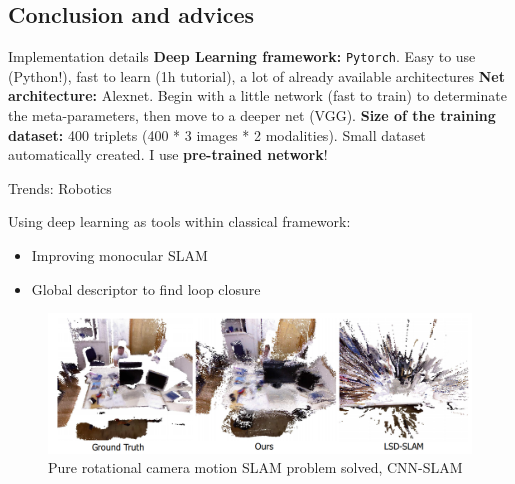 \subsection{Conclusion and advices}

\label{sec:results}

\begin{frame}{Implementation details}
	\vfill	
	\textbf{Deep Learning framework:} \texttt{Pytorch}. Easy to use (Python!), fast to learn (1h tutorial), a lot of already available architectures
	\vfill
	\textbf{Net architecture:} Alexnet. Begin with a little network (fast to train) to determinate the meta-parameters, then move to a deeper net (VGG).
	\vfill
	\textbf{Size of the training dataset:} 400 triplets (400 * 3 images * 2 modalities). Small dataset automatically created. I use \textbf{pre-trained network}!
	\vfill
\end{frame}

\begin{frame}{Trends: Robotics}

	Using deep learning as tools within classical framework:
	\begin{itemize}
		\item Improving monocular SLAM
		\item Global descriptor to find loop closure
	\end{itemize}
	\begin{figure}
		\includegraphics[width=0.9\linewidth]{images/cnnslam.png}
		\caption{Pure rotational camera motion SLAM problem solved, CNN-SLAM~\cite{POINTNET}}
	\end{figure}
	
\end{frame}

